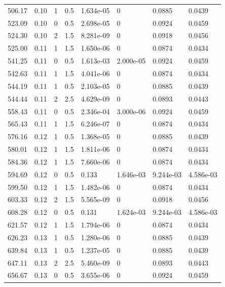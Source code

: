 \documentclass[preview]{standalone}
\begin{document}
{{{\begin{tabular}{L{1.2cm}C{1.2cm} C{0.3cm}C{0.5cm} C{1.4cm}C{1.4cm} C{1.4cm}C{1.4cm}}
  506.17  &  0.10  & 1     & 0.5 &  1.634e-05  & 0  & 0.0885 &  0.0439   \\ 
  523.09  &  0.10  & 0     & 0.5 &  2.698e-05  & 0  & 0.0924 &  0.0459   \\ 
  524.30  &  0.10  & 2     & 1.5 &  8.281e-09  & 0  & 0.0918 &  0.0456   \\ 
  525.00  &  0.11  & 1     & 1.5 &  1.650e-06  & 0  & 0.0874 &  0.0434   \\ 
  541.25  &  0.11  & 0     & 0.5 &  1.613e-03  & 2.000e-05  & 0.0924 &  0.0459   \\ 
  542.63  &  0.11  & 1     & 1.5 &  4.041e-06  & 0  & 0.0874 &  0.0434   \\ 
  544.19  &  0.11  & 1     & 0.5 &  2.103e-05  & 0  & 0.0885 &  0.0439   \\ 
  544.44  &  0.11  & 2     & 2.5 &  4.629e-09  & 0  & 0.0893 &  0.0443   \\ 
  558.43  &  0.11  & 0     & 0.5 &  2.346e-04  & 3.000e-06  & 0.0924 &  0.0459   \\ 
  565.43  &  0.11  & 1     & 1.5 &  6.246e-07  & 0  & 0.0874 &  0.0434   \\ 
  576.16  &  0.12  & 1     & 0.5 &  1.368e-05  & 0  & 0.0885 &  0.0439   \\ 
  580.01  &  0.12  & 1     & 1.5 &  1.811e-06  & 0  & 0.0874 &  0.0434   \\ 
  584.36  &  0.12  & 1     & 1.5 &  7.660e-06  & 0  & 0.0874 &  0.0434   \\ 
  594.69  &  0.12  & 0     & 0.5 &  0.133  & 1.646e-03  & 9.244e-03 &  4.586e-03   \\ 
  599.50  &  0.12  & 1     & 1.5 &  1.482e-06  & 0  & 0.0874 &  0.0434   \\ 
  603.33  &  0.12  & 2     & 1.5 &  5.565e-09  & 0  & 0.0918 &  0.0456   \\ 
  608.28  &  0.12  & 0     & 0.5 &  0.131  & 1.624e-03  & 9.244e-03 &  4.586e-03   \\ 
  621.57  &  0.12  & 1     & 1.5 &  1.794e-06  & 0  & 0.0874 &  0.0434   \\ 
  626.23  &  0.13  & 1     & 0.5 &  1.280e-06  & 0  & 0.0885 &  0.0439   \\ 
  639.84  &  0.13  & 1     & 0.5 &  1.237e-05  & 0  & 0.0885 &  0.0439   \\ 
  647.11  &  0.13  & 2     & 2.5 &  5.460e-09  & 0  & 0.0893 &  0.0443   \\ 
  656.67  &  0.13  & 0     & 0.5 &  3.655e-06  & 0  & 0.0924 &  0.0459   \\ 

\end{tabular}}}}
\end{document}
